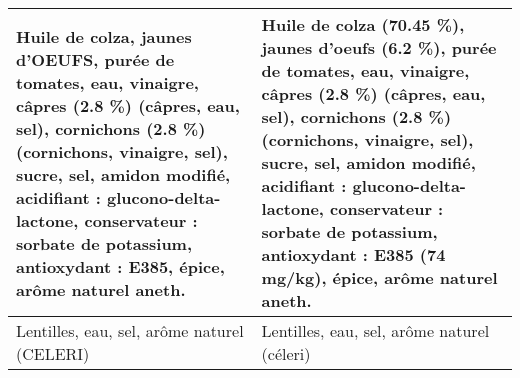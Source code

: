 \begin{longtable}{p{7cm}p{7cm}}
                                                                                                                                                                                                                                                                                                                                                                                                                                                                                                       Huile de colza, jaunes d'OEUFS, purée de tomates, eau, vinaigre, câpres (2.8 \%) (câpres, eau, sel), cornichons (2.8 \%) (cornichons, vinaigre, sel), sucre, sel,  amidon modifié, acidifiant : glucono-delta-lactone, conservateur : sorbate de potassium, antioxydant : E385, épice, arôme naturel aneth. &                                                                                                                                                                                                                                                                                                                                                                                                                                                                      Huile de colza (70.45 \%), jaunes d'oeufs (6.2 \%), purée de tomates, eau, vinaigre, câpres (2.8 \%) (câpres, eau, sel), cornichons (2.8 \%) (cornichons, vinaigre, sel), sucre, sel, amidon modifié, acidifiant : glucono-delta-lactone, conservateur : sorbate de potassium, antioxydant : E385 (74 mg/kg), épice, arôme naturel aneth. \\ \hline
                                                                                                                                                                                                                                                                                                                                                                                                                                                                                                                                                                                                                                                                                                                                                                     Lentilles, eau, sel, arôme naturel (CELERI) &                                                                                                                                                                                                                                                                                                                                                                                                                                                                                                                                                                                                                                                                                                                                                                Lentilles, eau, sel, arôme naturel (céleri) \\ \hline

\end{longtable}
